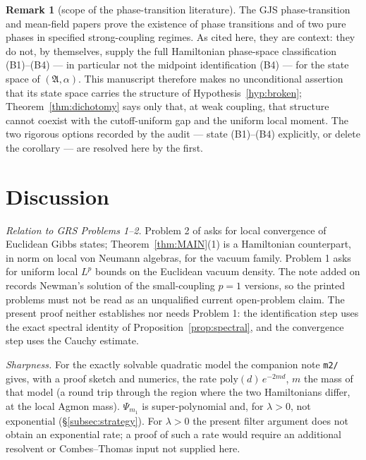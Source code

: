 \documentclass[11pt,a4paper]{article}
\theoremstyle{plain}
\theoremstyle{definition}
\newtheorem{remark}[theorem]{Remark}
\theoremstyle{plain}
\theoremstyle{definition}
\newcommand{\A}{\mathfrak{A}}
\begin{document}
\begin{remark}[scope of the phase-transition literature]\label{rem:gjs7576}
The GJS phase-transition and mean-field papers \cite{GJS75,GJS76} prove the existence of
phase transitions and of two pure phases in specified strong-coupling regimes. As cited
here, they are context: they do not, by themselves, supply the full Hamiltonian
phase-space classification (B1)--(B4) --- in particular not the midpoint identification
(B4) --- for the state space of $(\A,\alpha)$. This manuscript therefore makes no
unconditional assertion that its state space carries the structure of
Hypothesis~\ref{hyp:broken}; Theorem~\ref{thm:dichotomy} says only that, at weak coupling,
that structure cannot coexist with the cutoff-uniform gap and the uniform local moment. The two rigorous options
recorded by the audit --- state (B1)--(B4) explicitly, or delete the corollary --- are
resolved here by the first.
\end{remark}

\section{Discussion}\label{sec:discussion}

\emph{Relation to GRS Problems 1--2.} Problem 2 of \cite[p.~126]{GRS75} asks for local
convergence of Euclidean Gibbs states; Theorem~\ref{thm:MAIN}(1) is a Hamiltonian
counterpart, in norm on local von Neumann algebras, for the vacuum family. Problem 1 asks
for uniform local $L^p$ bounds on the Euclidean vacuum density. The note added on
\cite[p.~128]{GRS75} records Newman's solution of the small-coupling $p=1$ versions, so
the printed problems must not be read as an unqualified current open-problem claim. The
present proof neither establishes nor needs Problem 1: the identification step uses the
exact spectral identity of Proposition~\ref{prop:spectral}, and the convergence step uses
the Cauchy estimate.

\emph{Sharpness.} For the exactly solvable quadratic model the companion note \texttt{m2/}
gives, with a proof sketch and numerics, the rate $\mathrm{poly}(d)\,e^{-2md}$, $m$ the mass of
that model (a round trip through the region where the two Hamiltonians differ, at the local
Agmon mass). $\Psi_{m_1}$ is super-polynomial and, for $\lambda>0$, not exponential
(\S\ref{subsec:strategy}). For $\lambda>0$ the present filter argument does not obtain an exponential rate; a
proof of such a rate would require an additional resolvent or Combes--Thomas input not supplied
here.
\end{document}
